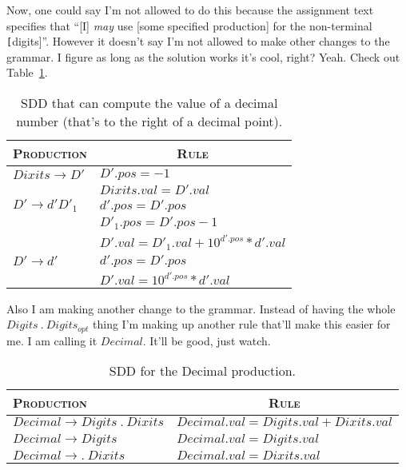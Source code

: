 Now, one could say I'm not allowed to do this because the assignment text specifies that ``[I] \emph{may} use [some specified production] for the non-terminal \texttt[digits]''.
However it doesn't say I'm not allowed to make other changes to the grammar.
I figure as long as the solution works it's cool, right?
Yeah.
Check out Table~\ref{tab:5-2}.

\begin{table}[H]
	\centering
	\begin{tabular}{l|l}
	\hline	\hline
	\textsc{Production}			& \multicolumn{1}{c}{\textsc{Rule}} \\ \hline
	$Dixits\rightarrow D'$	& $D'.pos = -1$ \\ 
							& $Dixits.val = D'.val$ \\ \hline
	$D'\rightarrow d'D'_1$	& $d'.pos = D'.pos$	\\
							& $D'_1.pos = D'.pos - 1$ \\
							& $D'.val = D'_1.val + 10^{d'.pos}*d'.val$ \\ \hline
	$D'\rightarrow d'$		& $d'.pos = D'.pos$	\\
							& $D'.val = 10^{d'.pos}*d'.val$\\

	\hline
	\end{tabular}	
	\caption{SDD that can compute the value of a decimal number (that's to the right of a decimal point).}
	\label{tab:5-2}
\end{table}

Also I am making another change to the grammar.
Instead of having the whole $Digits~.~Digits_{opt}$ thing I'm making up another rule that'll make this easier for me.
I am calling it $Decimal$.
It'll be good, just watch.

\begin{table}[H]
	\centering
	\begin{tabular}{l|l}
	\hline	\hline
	\textsc{Production}						& \multicolumn{1}{c}{\textsc{Rule}} \\ \hline
	$Decimal\rightarrow Digits~.~Dixits$	& $Decimal.val = Digits.val + Dixits.val$ \\ \hline
	$Decimal\rightarrow Digits$				& $Decimal.val = Digits.val$ \\ \hline
	$Decimal\rightarrow .~Dixits$			& $Decimal.val = Dixits.val$ \\
	\hline
	\end{tabular}	
	\caption{SDD for the Decimal production.}
	\label{tab:5-3}
\end{table}

